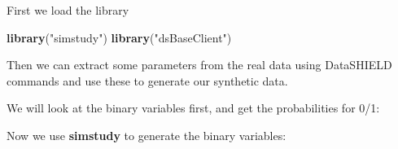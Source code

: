 \documentclass[
]{book}
\newenvironment{Shaded}{\begin{snugshade}}{\end{snugshade}}
\newcommand{\ControlFlowTok}[1]{\textcolor[rgb]{0.13,0.29,0.53}{\textbf{#1}}}
\newcommand{\DataTypeTok}[1]{\textcolor[rgb]{0.13,0.29,0.53}{#1}}
\newcommand{\DecValTok}[1]{\textcolor[rgb]{0.00,0.00,0.81}{#1}}
\newcommand{\KeywordTok}[1]{\textcolor[rgb]{0.13,0.29,0.53}{\textbf{#1}}}
\newcommand{\NormalTok}[1]{#1}
\newcommand{\OperatorTok}[1]{\textcolor[rgb]{0.81,0.36,0.00}{\textbf{#1}}}
\newcommand{\StringTok}[1]{\textcolor[rgb]{0.31,0.60,0.02}{#1}}
\begin{document}
First we load the library

\begin{Shaded}
\begin{Highlighting}[]
\KeywordTok{library}\NormalTok{(}\StringTok{"simstudy"}\NormalTok{)}
\KeywordTok{library}\NormalTok{(}\StringTok{"dsBaseClient"}\NormalTok{)}
\end{Highlighting}
\end{Shaded}

Then we can extract some parameters from the real data using DataSHIELD commands and use these to generate our synthetic data.

We will look at the binary variables first, and get the probabilities for 0/1:

\begin{Shaded}
\end{Shaded}

Now we use \textbf{simstudy} to generate the binary variables:
\end{document}
